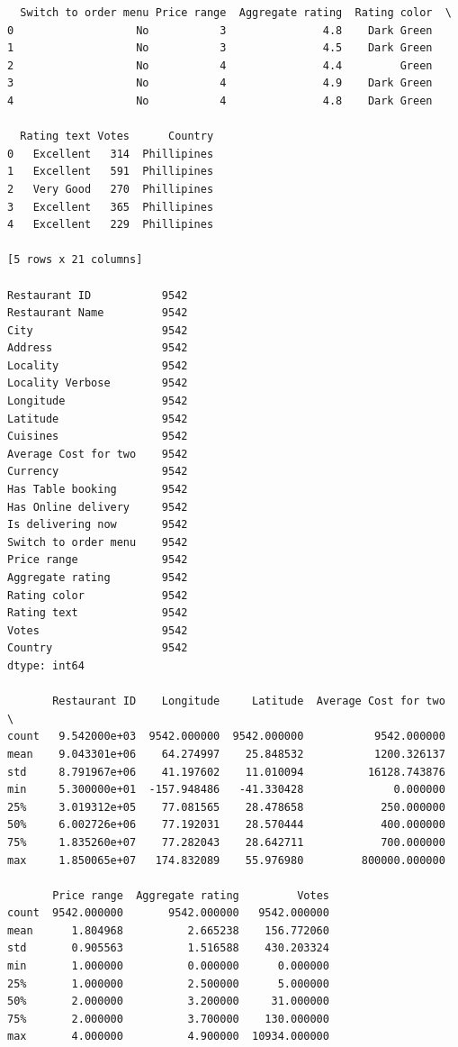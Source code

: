 \documentclass[11pt]{article} %
\begin{document}
\begin{lstlisting}
  Switch to order menu Price range  Aggregate rating  Rating color  \
0                   No           3               4.8    Dark Green   
1                   No           3               4.5    Dark Green   
2                   No           4               4.4         Green   
3                   No           4               4.9    Dark Green   
4                   No           4               4.8    Dark Green   

  Rating text Votes      Country  
0   Excellent   314  Phillipines  
1   Excellent   591  Phillipines  
2   Very Good   270  Phillipines  
3   Excellent   365  Phillipines  
4   Excellent   229  Phillipines  

[5 rows x 21 columns] 

Restaurant ID           9542
Restaurant Name         9542
City                    9542
Address                 9542
Locality                9542
Locality Verbose        9542
Longitude               9542
Latitude                9542
Cuisines                9542
Average Cost for two    9542
Currency                9542
Has Table booking       9542
Has Online delivery     9542
Is delivering now       9542
Switch to order menu    9542
Price range             9542
Aggregate rating        9542
Rating color            9542
Rating text             9542
Votes                   9542
Country                 9542
dtype: int64 

       Restaurant ID    Longitude     Latitude  Average Cost for two  \
count   9.542000e+03  9542.000000  9542.000000           9542.000000   
mean    9.043301e+06    64.274997    25.848532           1200.326137   
std     8.791967e+06    41.197602    11.010094          16128.743876   
min     5.300000e+01  -157.948486   -41.330428              0.000000   
25%     3.019312e+05    77.081565    28.478658            250.000000   
50%     6.002726e+06    77.192031    28.570444            400.000000   
75%     1.835260e+07    77.282043    28.642711            700.000000   
max     1.850065e+07   174.832089    55.976980         800000.000000   

       Price range  Aggregate rating         Votes  
count  9542.000000       9542.000000   9542.000000  
mean      1.804968          2.665238    156.772060  
std       0.905563          1.516588    430.203324  
min       1.000000          0.000000      0.000000  
25%       1.000000          2.500000      5.000000  
50%       2.000000          3.200000     31.000000  
75%       2.000000          3.700000    130.000000  
max       4.000000          4.900000  10934.000000   


\end{lstlisting}
\end{document}
